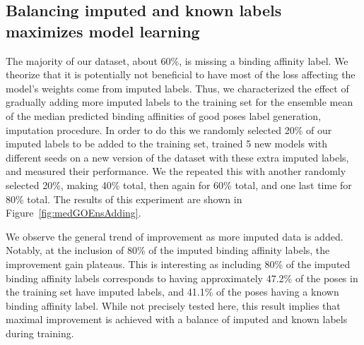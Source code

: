 \documentclass[journal=jmcmar,manuscript=article]{achemso}
\begin{document}
\subsection{Balancing imputed and known labels maximizes model learning}
The majority of our dataset, about 60\%, is missing a binding affinity label.
We theorize that it is potentially not beneficial to have most of the loss affecting the model's weights come from imputed labels.
Thus, we characterized the effect of gradually adding more imputed labels to the training set for the ensemble mean of the median predicted binding affinities of good poses label generation, imputation procedure.
In order to do this we randomly selected 20\% of our imputed labels to be added to the training set, trained 5 new models with different seeds on a new version of the dataset with these extra imputed labels, and measured their performance.
We the repeated this with another randomly selected 20\%, making 40\% total, then again for 60\% total, and one last time for 80\% total.
The results of this experiment are shown in Figure~\ref{fig:medGOEnsAdding}.

We observe the general trend of improvement as more imputed data is added.
Notably, at the inclusion of 80\% of the imputed binding affinity labels, the improvement gain plateaus.
This is interesting as including 80\% of the imputed binding affinity labels corresponds to having approximately 47.2\% of the poses in the training set have imputed labels, and 41.1\% of the poses having a known binding affinity label.
While not precisely tested here, this result implies that maximal improvement is achieved with a balance of imputed and known labels during training.
\end{document}
